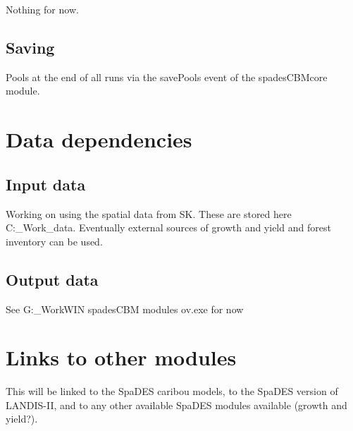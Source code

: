 \documentclass[]{article}
\begin{document}
Nothing for now.

\subsection{Saving}\label{saving}

Pools at the end of all runs via the savePools event of the
spadesCBMcore module.

\section{Data dependencies}\label{data-dependencies}

\subsection{Input data}\label{input-data}

Working on using the spatial data from SK. These are stored here
C:\Celine\Syndocs\RES\_Work\Work\SpaDES\SK\_data. Eventually external
sources of growth and yield and forest inventory can be used.

\subsection{Output data}\label{output-data}

See G:\RES\_Work\Work\SpaDES\spadesCBM\Prezi WIN spadesCBM modules
ov.exe for now

\section{Links to other modules}\label{links-to-other-modules}

This will be linked to the SpaDES caribou models, to the SpaDES version
of LANDIS-II, and to any other available SpaDES modules available
(growth and yield?).
\end{document}
